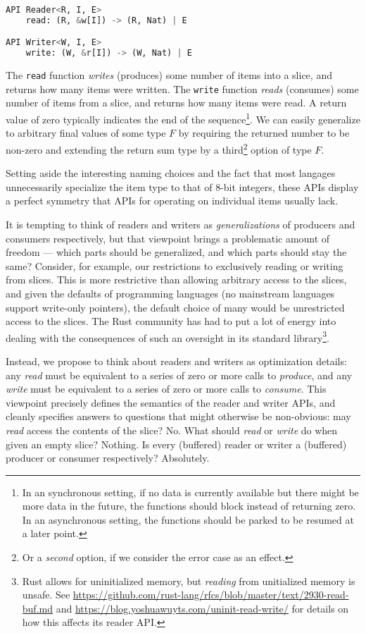 \documentclass[sigplan,screen,10pt,review]{acmart}
\begin{document}
\begin{lstlisting}[language=Python]
API Reader<R, I, E>
    read: (R, &w[I]) -> (R, Nat) | E

API Writer<W, I, E>
    write: (W, &r[I]) -> (W, Nat) | E
\end{lstlisting}

The \texttt{read} function \textit{writes} (produces) some number of items into a slice, and returns how many items were written. The \texttt{write} function \textit{reads} (consumes) some number of items from a slice, and returns how many items were read. A return value of zero typically indicates the end of the sequence\footnote{In an synchronous setting, if no data is currently available but there might be more data in the future, the functions should block instead of returning zero. In an asynchronous setting, the functions should be parked to be resumed at a later point.}. We can easily generalize to arbitrary final values of some type $F$ by requiring the returned number to be non-zero and extending the return sum type by a third\footnote{Or a \textit{second} option, if we consider the error case as an effect.} option of type $F$.

Setting aside the interesting naming choices and the fact that most langages unnecessarily specialize the item type to that of 8-bit integers, these APIs display a perfect symmetry that APIs for operating on individual items usually lack.

It is tempting to think of readers and writers as \textit{generalizations} of producers and consumers respectively, but that viewpoint brings a problematic amount of freedom --- which parts should be generalized, and which parts should stay the same? Consider, for example, our restrictions to exclusively reading or writing from slices. This is more restrictive than allowing arbitrary access to the slices, and given the defaults of programming languages (no mainstream languages support write-only pointers), the default choice of many would be unrestricted access to the slices. The Rust community has had to put a lot of energy into  dealing with the consequences of such an oversight in its standard library\footnote{Rust allows for uninitialized memory, but \textit{reading} from unitialized memory is unsafe. See \url{https://github.com/rust-lang/rfcs/blob/master/text/2930-read-buf.md} and \url{https://blog.yoshuawuyts.com/uninit-read-write/} for details on how this affects its reader API.}.

Instead, we propose to think about readers and writers as optimization details: any \textit{read} must be equivalent to a series of zero or more calls to \textit{produce}, and any \textit{write} must be equivalent to a series of zero or more calls to \textit{consume}. This viewpoint precisely defines the semantics of the reader and writer APIs, and cleanly specifies answers to questions that might otherwise be non-obvious: may \textit{read} access the contents of the slice? No. What should \textit{read} or \textit{write} do when given an empty slice? Nothing. Is every (buffered) reader or writer a (buffered) producer or consumer respectively? Absolutely.
\end{document}
